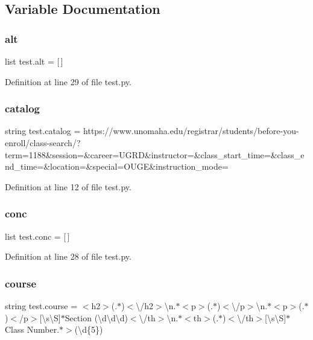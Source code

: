 \subsection{Variable Documentation}
\mbox{\label{namespacetest_a292455049888b41870b9f53769925dc5}} 
\subsubsection{\texorpdfstring{alt}{alt}}
{\footnotesize\ttfamily list test.\+alt = \mbox{[}$\,$\mbox{]}}



Definition at line 29 of file test.\+py.

\mbox{\label{namespacetest_a558bb89ee60dd0d0cdc82c89fd7db764}} 
\subsubsection{\texorpdfstring{catalog}{catalog}}
{\footnotesize\ttfamily string test.\+catalog = \textquotesingle{}https\+://www.\+unomaha.\+edu/registrar/students/before-\/you-\/enroll/class-\/search/?term=1188\&session=\&career=U\+G\+RD\&instructor=\&class\+\_\+start\+\_\+time=\&class\+\_\+end\+\_\+time=\&location=\&special=O\+U\+GE\&instruction\+\_\+mode=\textquotesingle{}}



Definition at line 12 of file test.\+py.

\mbox{\label{namespacetest_a8d2404d0b6835bb0517fc1271e2b0b3c}} 
\subsubsection{\texorpdfstring{conc}{conc}}
{\footnotesize\ttfamily list test.\+conc = \mbox{[}$\,$\mbox{]}}



Definition at line 28 of file test.\+py.

\mbox{\label{namespacetest_aef2c5d7bd8ec9fc2ba0447263d36cbc5}} 
\subsubsection{\texorpdfstring{course}{course}}
{\footnotesize\ttfamily string test.\+course = \textquotesingle{}$<$h2$>$(.$\ast$)$<$\textbackslash{}/h2$>$\textbackslash{}n.$\ast$$<$p$>$(.$\ast$)$<$\textbackslash{}/p$>$\textbackslash{}n.$\ast$$<$p$>$(.$\ast$)$<$/p$>$\mbox{[}\textbackslash{}s\textbackslash{}S\mbox{]}$\ast$Section (\textbackslash{}d\textbackslash{}d\textbackslash{}d)$<$\textbackslash{}/th$>$\textbackslash{}n.$\ast$$<$th$>$(.$\ast$)$<$\textbackslash{}/th$>$\mbox{[}\textbackslash{}s\textbackslash{}S\mbox{]}$\ast$Class Number.$\ast$$>$(\textbackslash{}d\{5\})\textquotesingle{}}



